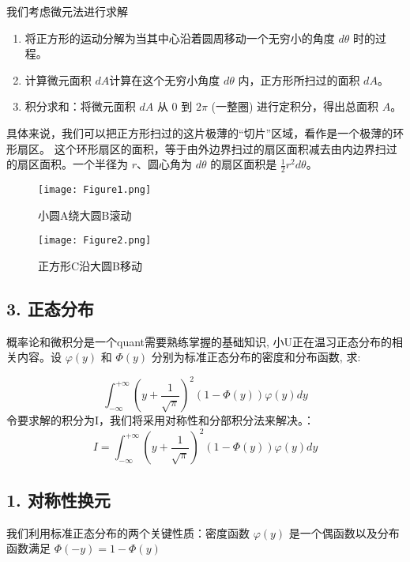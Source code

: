 \documentclass[UTF8]{ctexart}
\begin{document}
我们考虑微元法进行求解

\begin{enumerate}
    \item 将正方形的运动分解为当其中心沿着圆周移动一个无穷小的角度 $d\theta$ 时的过程。
    \item 计算微元面积 $dA$计算在这个无穷小角度 $d\theta$ 内，正方形所扫过的面积 $dA$。
    \item 积分求和：将微元面积 $dA$ 从 $0$ 到 $2\pi$ (一整圈) 进行定积分，得出总面积 $A$。
\end{enumerate}
具体来说，我们可以把正方形扫过的这片极薄的“切片”区域，看作是一个极薄的环形扇区。
这个环形扇区的面积，等于由外边界扫过的扇区面积减去由内边界扫过的扇区面积。一个半径为 $r$、圆心角为 $d\theta$ 的扇区面积是 $\frac{1}{2}r^2 d\theta$。


\begin{figure}[h!]
    \centering
    \begin{minipage}{0.45\textwidth}
        \centering
        \texttt{[image: Figure1.png]} 
        \caption{小圆A绕大圆B滚动}
        \label{fig:fig1}
    \end{minipage}\hfill
    \begin{minipage}{0.45\textwidth}
        \centering
        \texttt{[image: Figure2.png]}
        \caption{正方形C沿大圆B移动}
        \label{fig:fig2}
    \end{minipage}
\end{figure}


\subsection*{3. 正态分布}
概率论和微积分是一个quant需要熟练掌握的基础知识, 小U正在温习正态分布的相关内容。设 $\varphi(y)$ 和 $\Phi(y)$ 分别为标准正态分布的密度和分布函数, 求:

$$\int_{-\infty}^{+\infty}{\left(y+\frac{1}{\sqrt{\pi}}\right)^{2}(1-\Phi(y))\varphi
  (y)dy}$$
令要求解的积分为I，我们将采用对称性和分部积分法来解决。：
$$ I = \int_{-\infty}^{+\infty}{\left(y+\frac{1}{\sqrt{\pi}}\right)^{2}(1-\Phi(y))\varphi(y)dy} $$

\subsection*{1. 对称性换元}
我们利用标准正态分布的两个关键性质：密度函数 $\varphi(y)$ 是一个偶函数以及分布函数满足 $\Phi(-y) = 1 - \Phi(y)$
\end{document}
